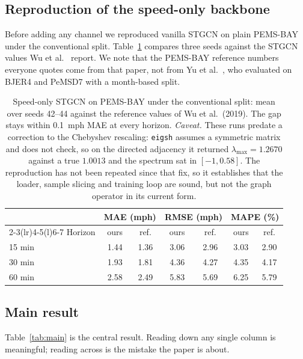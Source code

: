 \documentclass[letterpaper]{article}
\begin{document}
\subsection{Reproduction of the speed-only backbone}

Before adding any channel we reproduced vanilla STGCN on plain PEMS-BAY under the conventional split. Table~\ref{tab:repro} compares three seeds against the STGCN values Wu et al.~ report. We note that the PEMS-BAY reference numbers everyone quotes come from that paper, not from Yu et al.~, who evaluated on BJER4 and PeMSD7 with a month-based split.

\begin{table}[t]
\centering
\small
\setlength{\tabcolsep}{4.5pt}
\begin{tabular}{@{}lcccccc@{}}
\toprule
 & \multicolumn{2}{c}{MAE (mph)} & \multicolumn{2}{c}{RMSE (mph)} & \multicolumn{2}{c}{MAPE (\%)} \\
\cmidrule(lr){2-3}\cmidrule(lr){4-5}\cmidrule(l){6-7}
Horizon & ours & ref. & ours & ref. & ours & ref. \\
\midrule
15 min & 1.44 & 1.36 & 3.06 & 2.96 & 3.03 & 2.90 \\
30 min & 1.93 & 1.81 & 4.36 & 4.27 & 4.35 & 4.17 \\
60 min & 2.58 & 2.49 & 5.83 & 5.69 & 6.25 & 5.79 \\
\bottomrule
\end{tabular}
\caption{Speed-only STGCN on PEMS-BAY under the conventional split: mean over seeds 42--44 against the reference values of Wu et al.~(2019). The gap stays within 0.1~mph MAE at every horizon. \emph{Caveat.} These runs predate a correction to the Chebyshev rescaling: \texttt{eigsh} assumes a symmetric matrix and does not check, so on the directed adjacency it returned $\lambda_{\max}=1.2670$ against a true $1.0013$ and the spectrum sat in $[-1,0.58]$. The reproduction has not been repeated since that fix, so it establishes that the loader, sample slicing and training loop are sound, but not the graph operator in its current form.}
\label{tab:repro}
\end{table}

\subsection{Main result}

Table~\ref{tab:main} is the central result. Reading down any single column is meaningful; reading across is the mistake the paper is about.
\end{document}
